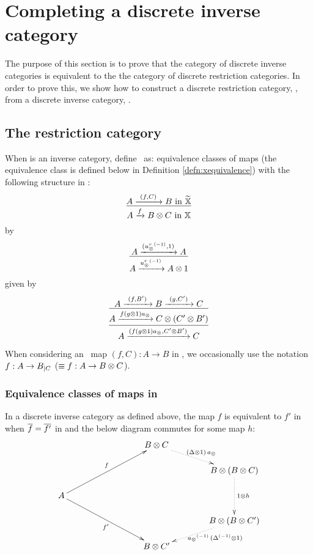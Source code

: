 
\section{Completing a discrete inverse category} %
\label{sec:completing_a_discrete_inverse_category}

The purpose of this section is to prove that the category of discrete inverse categories is
equivalent to the the category of discrete restriction categories. In order to prove this, we show
how to construct a discrete restriction category, \Xt, from a discrete inverse category, \X.


\subsection{The restriction category \hypXt} %
\label{sub:the_restriction_category_hypxt}

\begin{definition}\label{def:xt}

  When \X is an inverse category, define \Xt\ as:
  {
    equivalence classes of maps (the equivalence class is defined below in Definition
    \vref{defn:xequivalence}) with the following structure in \X: %
    \[
      \infer{A\xrightarrow{f} B\*C \text{ in }\X}{A \xrightarrow{\ (f,C)\ } B \text{ in } \Xt}
      \]
  }
  {%
    by
    \[
      \infer{A\xrightarrow{\inv{u_{\*}^r}}A\* 1}
            {A \xrightarrow{(\inv{u_{\*}^r}, 1)} A}
    \]
  }
  {%
    given by
    \[
      \infer{
        \infer{A\xrightarrow{(f (g\*1) a_{\*},C' \* B')} C}
              {A\xrightarrow{f (g\*1) a_{\*}} C \* (C' \* B')}
            }
            {A \xrightarrow{\ (f,B')\ } B \xrightarrow{\ (g,C')\ } C}
    \]
  }

\end{definition}

When considering an \Xt\ map $(f,C):A\to B$ in \X, we occasionally use the notation $f:A\to
{B}_{|{C}}$ ($\equiv f:A\to B\otimes C$).

\subsubsection{Equivalence classes of maps in \hypX} %
\label{ssub:equivalence_classes_of_maps_in_hypx}


\begin{definition}\label{defn:xequivalence}
  In a discrete inverse category \X as defined above, the map $f$ is equivalent to $f'$ in \X when
  $\overline{f} = \overline{f'}$ in \X and the below diagram commutes for some map $h$:
  \[
    \xymatrix @C=40pt @R=15pt{
      & & B \* C \ar@{.>}[dr]^{(\Delta\* 1) \, a_{\*}}\\
      && & B \* (B\* C) \ar@{.>}[dd]^{1\* h} \\
      A \ar[uurr]^f \ar[ddrr]_{f'}&&&\\
      && & B \* (B \* C') \ar@{.>}[dl]^(.4){\ \inv{a_{\*}}\,(\inv{\Delta}\* 1)}\\
      && B\* C'
    }
  \]
\end{definition}

